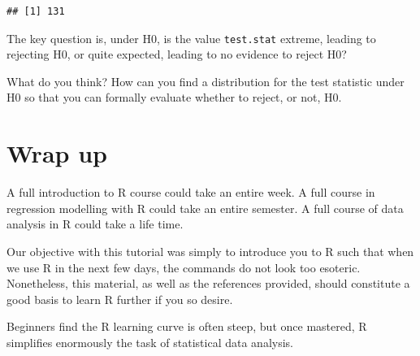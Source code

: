 \documentclass[
]{article}
\newenvironment{Shaded}{\begin{snugshade}}{\end{snugshade}}
\newcommand{\AttributeTok}[1]{\textcolor[rgb]{0.13,0.29,0.53}{#1}}
\newcommand{\CommentTok}[1]{\textcolor[rgb]{0.56,0.35,0.01}{\textit{#1}}}
\newcommand{\DecValTok}[1]{\textcolor[rgb]{0.00,0.00,0.81}{#1}}
\newcommand{\FunctionTok}[1]{\textcolor[rgb]{0.13,0.29,0.53}{\textbf{#1}}}
\newcommand{\NormalTok}[1]{#1}
\newcommand{\OtherTok}[1]{\textcolor[rgb]{0.56,0.35,0.01}{#1}}
\newcommand{\SpecialCharTok}[1]{\textcolor[rgb]{0.81,0.36,0.00}{\textbf{#1}}}
\newcommand{\StringTok}[1]{\textcolor[rgb]{0.31,0.60,0.02}{#1}}
\begin{document}
\begin{Shaded}
\end{Shaded}

\begin{verbatim}
## [1] 131
\end{verbatim}

The key question is, under H0, is the value \texttt{test.stat} extreme,
leading to rejecting H0, or quite expected, leading to no evidence to
reject H0?

What do you think? How can you find a distribution for the test
statistic under H0 so that you can formally evaluate whether to reject,
or not, H0.

\section{Wrap up}\label{wrap-up}

A full introduction to R course could take an entire week. A full course
in regression modelling with R could take an entire semester. A full
course of data analysis in R could take a life time.

Our objective with this tutorial was simply to introduce you to R such
that when we use R in the next few days, the commands do not look too
esoteric. Nonetheless, this material, as well as the references
provided, should constitute a good basis to learn R further if you so
desire.

Beginners find the R learning curve is often steep, but once mastered, R
simplifies enormously the task of statistical data analysis.
\end{document}
